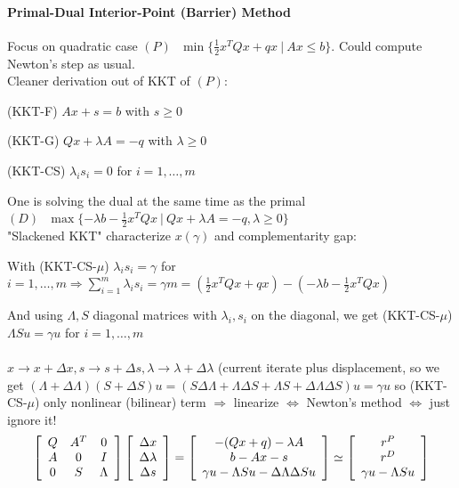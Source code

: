 \documentclass[10pt]{report}
\begin{document}
\paragraph{Primal-Dual Interior-Point (Barrier) Method} Focus on quadratic case $(P)\:\:\:\min\{\frac{1}{2}x^TQx+qx\:|\:Ax\leq b\}$. Could compute Newton's step as usual.\\
Cleaner derivation out of KKT of $(P)$:
\begin{list}{}{}
	\item[(KKT-F)] $Ax + s = b$ with $s\geq 0$
	\item[(KKT-G)] $Qx + \lambda A = -q$ with $\lambda \geq 0$
	\item[(KKT-CS)] $\lambda_i s_i= 0$ for $i=1,\ldots,m$
\end{list}
One is solving the dual at the same time as the primal $(D)\:\:\:\max\{-\lambda b-\frac{1}{2}x^TQx\:|\:Qx+\lambda A= - q, \lambda \geq 0\}$\\
"Slackened KKT" characterize $x(\gamma)$ and complementarity gap:
\begin{list}{}{}
	\item With (KKT-CS-$\mu$) $\lambda_i s_i = \gamma$ for $i=1,\ldots,m \Rightarrow \sum_{i=1}^m\lambda_i s_i = \gamma m = (\frac{1}{2}x^TQx + qx)-(-\lambda b - \frac{1}{2}x^TQx)$
\end{list}
And using $\Lambda, S$ diagonal matrices with $\lambda_i, s_i$ on the diagonal, we get (KKT-CS-$\mu$) $\Lambda Su = \gamma u$ for $i=1,\ldots,m$\\\\
$x\rightarrow x + \Delta x, s\rightarrow s + \Delta s, \lambda \rightarrow \lambda + \Delta\lambda$ (current iterate plus displacement, so we get $(\Lambda + \Delta\Lambda)(S+\Delta S)u = (S\Delta\Lambda + \Lambda\Delta S + \Lambda S + \Delta\Lambda\Delta S)u = \gamma u$ so (KKT-CS-$\mu$) only nonlinear (bilinear) term $\Rightarrow$ linearize $\Leftrightarrow$ Newton's method $\Leftrightarrow$ just ignore it!
$$\left[\begin{array}{c c c}
Q&A^T&0\\
A&0&I\\
0&S&\Lambda
\end{array}\right]\left[\begin{array}{c}
\Delta x\\
\Delta \lambda\\
\Delta s
\end{array}\right]=\left[\begin{array}{c}
-(Qx+q)-\lambda A\\
b-Ax-s\\
\gamma u-\Lambda Su - \Delta\Lambda\Delta Su
\end{array}\right] \simeq \left[\begin{array}{c}
r^P\\r^D\\\gamma u-\Lambda Su
\end{array}\right] $$
\end{document}
